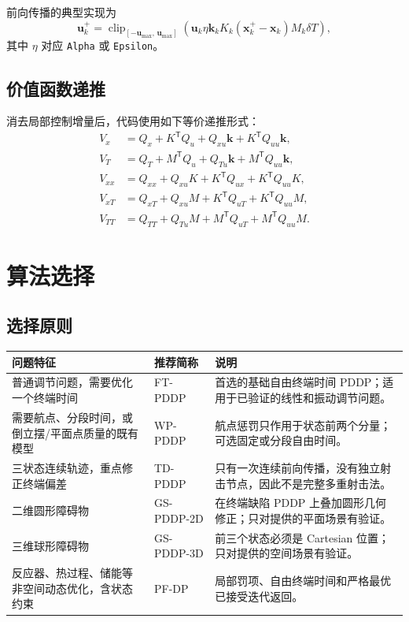 \documentclass[UTF8,zihao=-4,openany,fontset=fandol]{ctexbook}
\newcommand{\code}[1]{\nolinkurl{#1}}
\newcommand{\clip}{\operatorname{clip}}
\begin{document}
前向传播的典型实现为
\begin{equation}
  \bm{u}_k^+
  =
  \clip_{[-\bm{u}_{\max},\,\bm{u}_{\max}]}
  \left(
    \bm{u}_k
    \eta\bm{k}_k
    K_k(\bm{x}_k^+-\bm{x}_k)
    M_k\delta T
  \right),
  \label{eq:controlupdate}
\end{equation}
其中 $\eta$ 对应 \code{Alpha} 或 \code{Epsilon}。

\section{价值函数递推}

消去局部控制增量后，代码使用如下等价递推形式：
\begin{align}
  V_x &=
  Q_x+K^\mathsf{T}Q_u+Q_{xu}\bm{k}
  +K^\mathsf{T}Q_{uu}\bm{k},\\
  V_T &=
  Q_T+M^\mathsf{T}Q_u+Q_{Tu}\bm{k}
  +M^\mathsf{T}Q_{uu}\bm{k},\\
  V_{xx} &=
  Q_{xx}+Q_{xu}K+K^\mathsf{T}Q_{ux}
  +K^\mathsf{T}Q_{uu}K,\\
  V_{xT} &=
  Q_{xT}+Q_{xu}M+K^\mathsf{T}Q_{uT}
  +K^\mathsf{T}Q_{uu}M,\\
  V_{TT} &=
  Q_{TT}+Q_{Tu}M+M^\mathsf{T}Q_{uT}
  +M^\mathsf{T}Q_{uu}M.
\end{align}

\chapter{算法选择}

\section{选择原则}

\begin{longtable}{p{}p{}p{}}
\toprule
问题特征 & 推荐简称 & 说明\\
\midrule
\endhead
普通调节问题，需要优化一个终端时间 &
FT-PDDP &
首选的基础自由终端时间 PDDP；适用于已验证的线性和振动调节问题。\\

需要航点、分段时间，或倒立摆/平面点质量的既有模型 &
WP-PDDP &
航点惩罚只作用于状态前两个分量；可选固定或分段自由时间。\\

三状态连续轨迹，重点修正终端偏差 &
TD-PDDP &
只有一次连续前向传播，没有独立射击节点，因此不是完整多重射击法。\\

二维圆形障碍物 &
GS-PDDP-2D &
在终端缺陷 PDDP 上叠加圆形几何修正；只对提供的平面场景有验证。\\

三维球形障碍物 &
GS-PDDP-3D &
前三个状态必须是 Cartesian 位置；只对提供的空间场景有验证。\\

反应器、热过程、储能等非空间动态优化，含状态约束 &
PF-DP &
局部罚项、自由终端时间和严格最优已接受迭代返回。\\

\bottomrule
\end{longtable}
\end{document}
